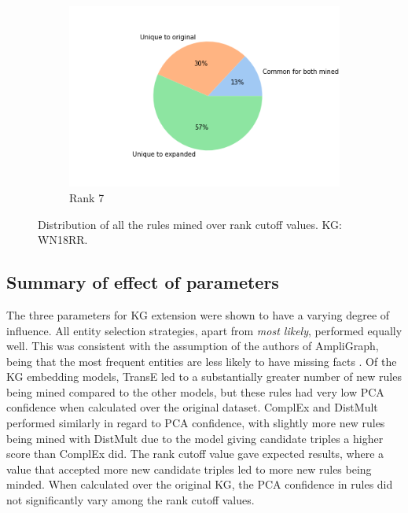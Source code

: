 \begin{figure}[htbp]
\begin{subfigure}[b]{0.3\textwidth}
            \centering 
            \includegraphics[width=\textwidth]{figures/results/ranks/pie_charts/('rank_cutoff', 7)_wn18rr.png}
            \caption[]%
            {{\small Rank 7}}    
            \label{fig:rank_7_pie_wn18rr}
        \end{subfigure}
        \hfill
        \caption[Distribution of rules over KG rank cutoff values - WN18RR KG.]
        {\small Distribution of all the rules mined over rank cutoff values. KG: WN18RR.} 
        \label{rank_pies_wn18rr}
    \end{figure}
    
\subsection{Summary of effect of parameters}
The three parameters for KG extension were shown to have a varying degree of influence. All entity selection strategies, apart from \textit{most likely}, performed equally well. This was consistent with the assumption of the authors of AmpliGraph, being that the most frequent entities are less likely to have missing facts \cite{ampligraph}. Of the KG embedding models, TransE led to a substantially greater number of new rules being mined compared to the other models, but these rules had very low PCA confidence when calculated over the original dataset. ComplEx and DistMult performed similarly in regard to PCA confidence, with slightly more new rules being mined with DistMult due to the model giving candidate triples a higher score than ComplEx did. The rank cutoff value gave expected results, where a value that accepted more new candidate triples led to more new rules being minded. When calculated over the original KG, the PCA confidence in rules did not significantly vary among the rank cutoff values. 

